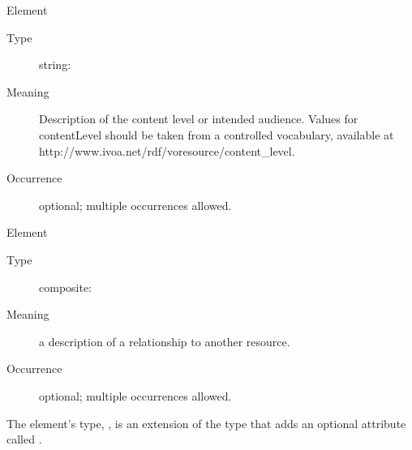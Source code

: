 \documentclass[11pt,a4paper]{ivoa}
\begin{document}
\begin{generated}
\begin{bigdescription}
\begin{description}
\end{description}
\item[Element \xmlel{contentLevel}]
\begin{description}
\item[Type] string: 
\item[Meaning] 
                Description of the content level or intended audience.
                Values for contentLevel should be taken from a controlled
                vocabulary, available at
                http://www.ivoa.net/rdf/voresource/content\_level.
             
\item[Occurrence] optional; multiple occurrences allowed.

\end{description}
\item[Element \xmlel{relationship}]
\begin{description}
\item[Type] composite: 
\item[Meaning] 
               a description of a relationship to another resource.  
             
\item[Occurrence] optional; multiple occurrences allowed.

\end{description}


\end{bigdescription}\endgroup

\endgroup
\end{generated}




The  element's type,
, is an extension of the
 type that adds an optional attribute called
.  
\end{document}
